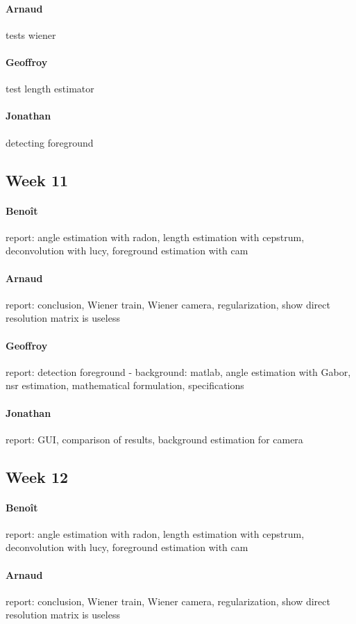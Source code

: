 \paragraph{Arnaud} tests wiener
\paragraph{Geoffroy} test length estimator
\paragraph{Jonathan} detecting foreground

\subsection*{Week 11}
\paragraph{Benoît} report: angle estimation with radon, length estimation with cepstrum, deconvolution with lucy, foreground estimation with cam
\paragraph{Arnaud} report: conclusion, Wiener train, Wiener camera, regularization, show direct resolution matrix is useless
\paragraph{Geoffroy} report: detection foreground - background: matlab, angle estimation with Gabor, nsr estimation, mathematical formulation, specifications
\paragraph{Jonathan} report: GUI, comparison of results, background estimation for camera

\subsection*{Week 12}
\paragraph{Benoît} report: angle estimation with radon, length estimation with cepstrum, deconvolution with lucy, foreground estimation with cam
\paragraph{Arnaud} report: conclusion, Wiener train, Wiener camera, regularization, show direct resolution matrix is useless
